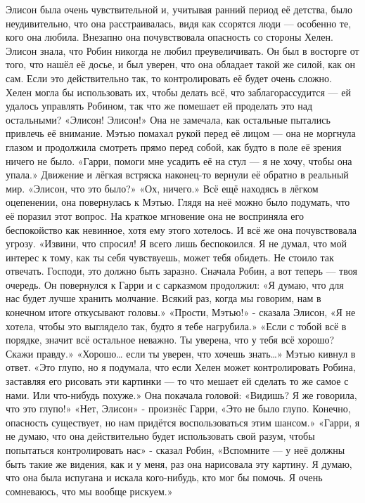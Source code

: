 \documentclass[a4paper,12pt]{book}
\begin{document}
	Элисон была очень чувствительной и, учитывая ранний период её детства, было неудивительно, что она расстраивалась, видя как ссорятся люди — особенно те, кого она любила.
	Внезапно она почувствовала опасность со стороны Хелен. Элисон знала, что Робин никогда не любил преувеличивать. Он был в восторге от того, что нашёл её досье, и был уверен, что она обладает такой же силой, как он сам. Если это действительно так, то контролировать её будет очень сложно. Хелен могла бы использовать их, чтобы делать всё, что заблагорассудится — ей удалось управлять Робином, так что же помешает ей проделать это над остальными?
	«Элисон! Элисон!»
	Она не замечала, как остальные пытались привлечь её внимание. Мэтью помахал рукой перед её лицом — она не моргнула глазом и продолжила смотреть прямо перед собой, как будто в поле её зрения ничего не было.
	«Гарри, помоги мне усадить её на стул — я не хочу, чтобы она упала.»
	Движение и лёгкая встряска наконец-то вернули её обратно в реальный мир.
	«Элисон, что это было?»
	«Ох, ничего.»
	Всё ещё находясь в лёгком оцепенении, она повернулась к Мэтью. Глядя на неё можно было подумать, что её поразил этот вопрос. На краткое мгновение она не восприняла его беспокойство как невинное, хотя ему этого хотелось. И всё же она почувствовала угрозу.
	«Извини, что спросил! Я всего лишь беспокоился. Я не думал, что мой интерес к тому, как ты себя чувствуешь, может тебя обидеть. Не стоило так отвечать. Господи, это должно быть заразно. Сначала Робин, а вот теперь — твоя очередь.
	Он повернулся к Гарри и с сарказмом продолжил:
	«Я думаю, что для нас будет лучше хранить молчание. Всякий раз, когда мы говорим, нам в конечном итоге откусывают головы.»
	«Прости, Мэтью!» - сказала Элисон,
	«Я не хотела, чтобы это выглядело так, будто я тебе нагрубила.»
	«Если с тобой всё в порядке, значит всё остальное неважно. Ты уверена, что у тебя всё хорошо? Скажи правду.»
	«Хорошо… если ты уверен, что хочешь знать…»
	Мэтью кивнул в ответ.
	«Это глупо, но я подумала, что если Хелен может контролировать Робина, заставляя его рисовать эти картинки — то что мешает ей сделать то же самое с нами. Или что-нибудь похуже.»
	Она покачала головой:
	«Видишь? Я же говорила, что это глупо!»
	«Нет, Элисон» - произнёс Гарри,
	«Это не было глупо. Конечно, опасность существует, но нам придётся воспользоваться этим шансом.»
	«Гарри, я не думаю, что она действительно будет использовать свой разум, чтобы попытаться контролировать нас» - сказал Робин,
	«Вспомните — у неё должны быть такие же видения, как и у меня, раз она нарисовала эту картину. Я думаю, что она была испугана и искала кого-нибудь, кто мог бы помочь. Я очень сомневаюсь, что мы вообще рискуем.»
\end{document}
